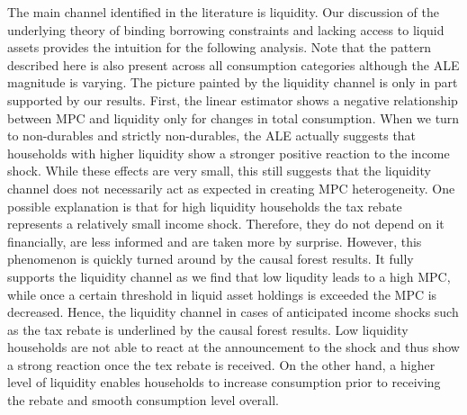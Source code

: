 The main channel identified in the literature is liquidity. Our discussion of the underlying theory of binding borrowing constraints and lacking access to liquid assets provides the intuition for the following analysis. Note that the pattern described here is also present across all consumption categories although the ALE magnitude is varying. The picture painted by the liquidity channel is only in part supported by our results. First, the linear estimator shows a negative relationship between MPC and liquidity only for changes in total consumption. When we turn to non-durables and strictly non-durables, the ALE actually suggests that households with higher liquidity show a stronger positive reaction to the income shock. While these effects are very small, this still suggests that the liquidity channel does not necessarily act as expected in creating MPC heterogeneity. One possible explanation is that for high liquidity households the tax rebate represents a relatively small income shock. Therefore, they do not depend on it financially, are less informed and are taken more by surprise. However, this phenomenon is quickly turned around by the causal forest results. It fully supports the liquidity channel as we find that low liqudity leads to a high MPC, while once a certain threshold in liquid asset holdings is exceeded the MPC is decreased. Hence, the liquidity channel in cases of anticipated income shocks such as the tax rebate is underlined by the causal forest results. Low liquidity households are not able to react at the announcement to the shock and thus show a strong reaction once the tex rebate is received. On the other hand, a higher level of liquidity enables households to increase consumption prior to receiving the rebate and smooth consumption level overall. \\
